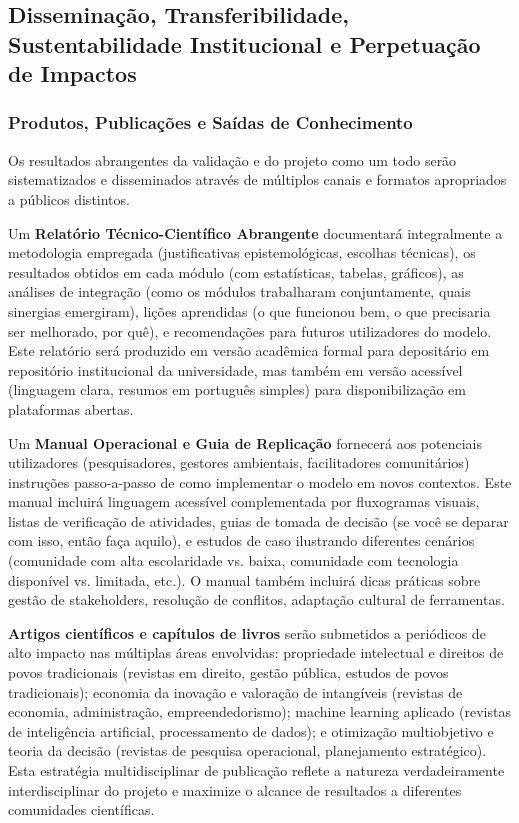 \subsection{Disseminação, Transferibilidade, Sustentabilidade Institucional e Perpetuação de Impactos}

\subsubsection{Produtos, Publicações e Saídas de Conhecimento}

Os resultados abrangentes da validação e do projeto como um todo serão sistematizados e disseminados através de múltiplos canais e formatos apropriados a públicos distintos.

Um \textbf{Relatório Técnico-Científico Abrangente} documentará integralmente a metodologia empregada (justificativas epistemológicas, escolhas técnicas), os resultados obtidos em cada módulo (com estatísticas, tabelas, gráficos), as análises de integração (como os módulos trabalharam conjuntamente, quais sinergias emergiram), lições aprendidas (o que funcionou bem, o que precisaria ser melhorado, por quê), e recomendações para futuros utilizadores do modelo. Este relatório será produzido em versão acadêmica formal para depositário em repositório institucional da universidade, mas também em versão acessível (linguagem clara, resumos em português simples) para disponibilização em plataformas abertas.

Um \textbf{Manual Operacional e Guia de Replicação} fornecerá aos potenciais utilizadores (pesquisadores, gestores ambientais, facilitadores comunitários) instruções passo-a-passo de como implementar o modelo em novos contextos. Este manual incluirá linguagem acessível complementada por fluxogramas visuais, listas de verificação de atividades, guias de tomada de decisão (se você se deparar com isso, então faça aquilo), e estudos de caso ilustrando diferentes cenários (comunidade com alta escolaridade vs. baixa, comunidade com tecnologia disponível vs. limitada, etc.). O manual também incluirá dicas práticas sobre gestão de stakeholders, resolução de conflitos, adaptação cultural de ferramentas.

\textbf{Artigos científicos e capítulos de livros} serão submetidos a periódicos de alto impacto nas múltiplas áreas envolvidas: propriedade intelectual e direitos de povos tradicionais (revistas em direito, gestão pública, estudos de povos tradicionais); economia da inovação e valoração de intangíveis (revistas de economia, administração, empreendedorismo); machine learning aplicado (revistas de inteligência artificial, processamento de dados); e otimização multiobjetivo e teoria da decisão (revistas de pesquisa operacional, planejamento estratégico). Esta estratégia multidisciplinar de publicação reflete a natureza verdadeiramente interdisciplinar do projeto e maximize o alcance de resultados a diferentes comunidades científicas.

